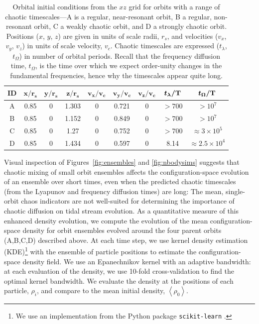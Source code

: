 \documentclass[letterpaper,12pt,preprint]{aastex}
\newcommand{\mean}[1]{\left< #1 \right>}
\newcommand{\bs}[1]{\boldsymbol{#1}}
\newcommand{\periods}{\ensuremath{{\rm T}}}
\begin{document}
\begin{table}[ht]
\begin{center}
	\begin{tabular}{c | c c c c c c | c c}
		{\bf ID} & $\bs{x/r_s}$ & $\bs{y/r_s}$ & $\bs{z/r_s}$ & $\bs{v_x/v_c}$ & $\bs{v_y/v_c}$ & $\bs{v_z/v_c}$ & $\bs{t_\lambda/\periods}$ & $\bs{t_\Omega/\periods}$ \\\toprule
A & 0.85 & 0 & 1.303 & 0 & 0.721 & 0 & $>700$ & $>10^7$ \\
\midrule
B & 0.85 & 0 & 1.152 & 0 & 0.849 & 0 & $>700$ & $>10^7$\\
\midrule
C & 0.85 & 0 & 1.27 & 0 & 0.752 & 0 & $>700$ & $\approx 3\times10^5$\\
\midrule
D & 0.85 & 0 & 1.434 & 0 & 0.597 & 0 & 8.14 & $\approx 2.5\times10^4$\\
		\bottomrule
		\end{tabular}
	\caption{Orbital initial conditions from the $xz$ grid for orbits with a range of chaotic timescales---A is a regular, near-resonant orbit, B a regular, non-resonant orbit, C a weakly chaotic orbit, and D a strongly chaotic orbit. Positions ($x$, $y$, $z$) are given in units of scale radii, $r_s$, and velocities ($v_x$, $v_y$, $v_z$) in units of scale velocity, $v_c$. Chaotic timescales are expressed ($t_\lambda$, $t_\Omega$) in number of orbital periods. Recall that the frequency diffusion time, $t_\Omega$, is the time over which we expect order-unity changes in the fundamental frequencies, hence why the timescales appear quite long. \label{tbl:orbit-info}}
\end{center}
\end{table}

Visual inspection of Figures~\ref{fig:ensembles} and \ref{fig:nbodysims} suggests that chaotic mixing of small orbit ensembles affects the configuration-space evolution of an ensemble over short times, even when the predicted chaotic timescales (from the Lyapunov and frequency diffusion times) are long: The mean, single-orbit chaos indicators are not well-suited for determining the importance of chaotic diffusion on tidal stream evolution. As a quantitative measure of this enhanced density evolution, we compute the evolution of the mean configuration-space density for orbit ensembles evolved around the four parent orbits (A,B,C,D) described above. At each time step, we use kernel density estimation (KDE)\footnote{We use an implementation from the Python package \texttt{scikit-learn} \citep{scikitlearn}.} with the ensemble of particle positions to estimate the configuration-space density field. We use an Epanechnikov kernel with an adaptive bandwidth: at each evaluation of the density, we use 10-fold cross-validation to find the optimal kernel bandwidth. We evaluate the density at the positions of each particle, $\rho_i$, and compare to the mean initial density, $\mean{\rho_0}$. 
\end{document}
